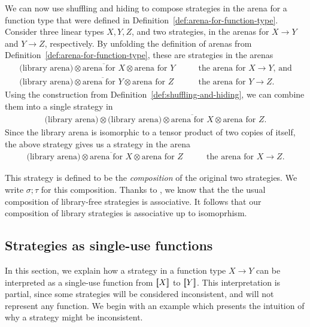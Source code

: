 We can now use shuffling and hiding to compose strategies in the arena for a function type that were defined in Definition~\ref{def:arena-for-function-type}.
Consider three linear types $X, Y, Z$, and two strategies, in the arenas for $X \to Y$ and $Y \to Z$, respectively.
 By unfolding the definition of arenas from Definition~\ref{def:arena-for-function-type}, these are strategies in the arenas 
\begin{align*}
\text{(library arena)} \otimes \overline{\text{arena for $X$}} \otimes \text{arena for $Y$} & \qquad \text{the arena for $X \to Y$, and}
\\
\text{(library arena)} \otimes \overline{\text{arena for $Y$}} \otimes \text{arena for $Z$} & \qquad \text{the arena for $Y \to Z$}.
\end{align*}
Using the construction from Definition~\ref{def:shuffling-and-hiding}, we can combine them into a single  strategy in 
\begin{align*}
\text{(library arena)} \otimes  \text{(library arena)}\otimes \overline{\text{arena for $X$}} \otimes \text{arena for $Z$}.
\end{align*}
Since the library arena is isomorphic to a tensor product of two copies of itself, the above strategy gives us a strategy in the arena 
\begin{align*}
    \text{(library arena)} \otimes   \overline{\text{arena for $X$}} \otimes \text{arena for $Z$} & \qquad \text{the arena for $X \to Z$.}
    \end{align*}

This strategy is defined to be the \emph{composition} of the original two  strategies. We write $\sigma; \tau$ for this composition. Thanks to \cite[Proposition~1.2]{abramsky2013semantics}, we know that the the usual
composition of library-free strategies is associative. It follows that our composition of library strategies is associative 
up to isomoprhism. 


\subsection{Strategies as single-use functions}
In this section, we explain how a strategy in a function type $X \to Y$ can be interpreted as a single-use function from $[{\kern-0.45ex}[X]{\kern-0.45ex}]$ to $[{\kern-0.45ex}[Y]{\kern-0.45ex}]$. This interpretation is partial, since some strategies will be considered inconsistent, and will not represent any function. We begin with an example which presents the intuition of why a strategy might be inconsistent. 

